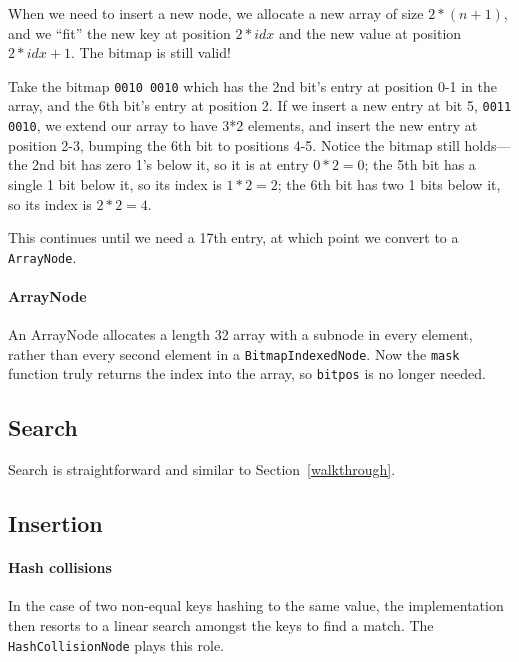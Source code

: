 \documentclass[preprint]{sigplanconf}
\begin{document}
When we need to insert a new node, we allocate
a new array of size $2*(n+1)$, and we ``fit''
the new key at position $2*idx$ and the new
value at position $2*idx+1$.
The bitmap is still valid!

Take the bitmap \texttt{0010 0010}
which has the 2nd bit's entry
at position 0-1 in the array, 
and the 6th bit's entry at position
2.
If we insert a new entry at bit 5,
\texttt{0011 0010}, 
we extend our array to have 3*2 elements,
and insert the new entry at position
2-3, bumping the 6th bit to positions
4-5.
Notice the bitmap still holds---the 2nd
bit has zero 1's below it, so it is at
entry $0*2 = 0$; the 5th bit has a single 1 bit below 
it, so its index is $1*2 = 2$; the 6th bit has
two 1 bits below it, so its index is $2*2 = 4$.

This continues until we need a 17th entry, at
which point we convert to a \texttt{ArrayNode}.

\paragraph{ArrayNode}


An ArrayNode allocates a length 32 array with a subnode
in every element, rather than every second element
in a \texttt{BitmapIndexedNode}.
Now the \texttt{mask} function truly returns the
index into the array, so \texttt{bitpos}
is no longer needed.


\subsection{Search}

Search is straightforward and similar to Section~\ref{walkthrough}.

\subsection{Insertion}

\paragraph{Hash collisions}
In the case of two non-equal keys hashing to the same value,
the implementation then resorts to a linear search amongst
the keys to find a match.
The \texttt{HashCollisionNode} plays this role.
\end{document}
